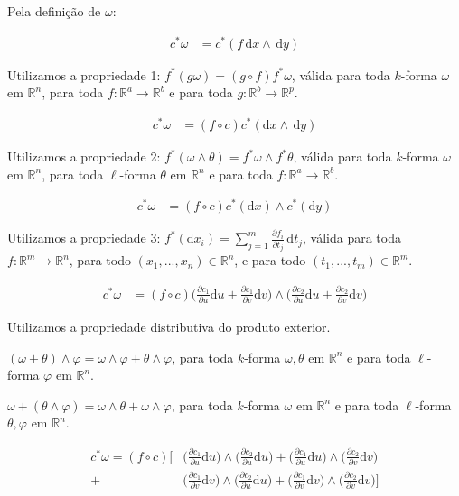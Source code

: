 \documentclass[12pt,a4paper]{article}
\begin{document}
		Pela defini\c{c}\~ao de $\omega$:

		\begin{align}
			c^*\omega &= c^*(f \,\mathrm{d}x \wedge \,\mathrm{d}y)
		\end{align}

		Utilizamos a propriedade 1: $f^*(g \omega) = (g \circ f) f^*\omega$, v\'alida para toda $k$-forma $\omega$ em $\mathbb{R}^n$, para toda $f : \mathbb{R}^a \rightarrow \mathbb{R}^b$ e para toda $g : \mathbb{R}^b \rightarrow \mathbb{R}^p$.

		\begin{align}
			c^*\omega &= (f \circ c) c^*(\mathrm{d}x \wedge \,\mathrm{d}y)
		\end{align}

		Utilizamos a propriedade 2: $f^*(\omega \wedge \theta) = f^*\omega \wedge f^*\theta$, v\'alida para toda $k$-forma $\omega$ em $\mathbb{R}^n$, para toda $\ell$-forma $\theta$ em $\mathbb{R}^n$ e para toda $f : \mathbb{R}^a \rightarrow \mathbb{R}^b$.

		\begin{align}
			c^*\omega &= (f \circ c) c^*(\mathrm{d}x) \wedge c^*(\mathrm{d}y)
		\end{align}

		Utilizamos a propriedade 3: $f^*(\mathrm{d}x_i) = \sum_{j = 1}^m \frac{\partial f_i}{\partial t_j} \,\mathrm{d}t_j$, v\'alida para toda $f : \mathbb{R}^m \rightarrow \mathbb{R}^n$, para todo $(x_1, ..., x_n) \in \mathbb{R}^n$, e para todo $(t_1, ..., t_m) \in \mathbb{R}^m$.

		\begin{align}
			c^*\omega &= (f \circ c) \biggl(\frac{\partial c_1}{\partial u}\mathrm{d}u + \frac{\partial c_1}{\partial v}\mathrm{d}v\biggl) \wedge \biggl(\frac{\partial c_2}{\partial u}\mathrm{d}u + \frac{\partial c_2}{\partial v}\mathrm{d}v \biggl)
		\end{align}

		Utilizamos a propriedade distributiva do produto exterior.

		$(\omega + \theta) \wedge \varphi = \omega \wedge \varphi + \theta \wedge \varphi$, para toda $k$-forma $\omega, \theta$ em $\mathbb{R}^n$ e para toda $\ell$-forma $\varphi$ em $\mathbb{R}^n$.

		$\omega + (\theta \wedge \varphi) = \omega \wedge \theta + \omega \wedge \varphi$, para toda $k$-forma $\omega$ em $\mathbb{R}^n$ e para toda $\ell$-forma $\theta, \varphi$ em $\mathbb{R}^n$.

		\begin{align}
			c^*\omega = (f \circ c) \biggl[ &\biggl(\frac{\partial c_1}{\partial u}\mathrm{d}u\biggl) \wedge \biggl(\frac{\partial c_2}{\partial u}\mathrm{d}u \biggl)
			+ \biggl(\frac{\partial c_1}{\partial u}\mathrm{d}u\biggl) \wedge \biggl(\frac{\partial c_2}{\partial v}\mathrm{d}v \biggl) \\
			+ &\biggl(\frac{\partial c_1}{\partial v}\mathrm{d}v\biggl) \wedge \biggl(\frac{\partial c_2}{\partial u}\mathrm{d}u \biggl)
			+ \biggl(\frac{\partial c_1}{\partial v}\mathrm{d}v\biggl) \wedge \biggl(\frac{\partial c_2}{\partial v}\mathrm{d}v \biggl) \biggl]
		\end{align}
\end{document}
